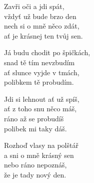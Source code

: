 
\ve{}
Zavři oči a jdi spát,\\
vždyť už bude brzo den\\
nech si o mně něco zdát,\\
ať je krásnej ten tvůj sen. 

\cho{}
Já budu chodit po špičkách,\\
snad tě tím nevzbudím\\
ať slunce vyjde v tmách,\\
polibkem tě probudím.

\ve{}
Jdi si lehnout ať už spíš,\\
ať z toho snu něco máš,\\
ráno až se probudíš\\
polibek mi taky dáš. 

\cho{}

\ve{} 
Rozhoď vlasy na polštář\\
a sni o mně krásný sen\\
nebo ráno nepoznáš,\\
že je tady nový den. 

\esong